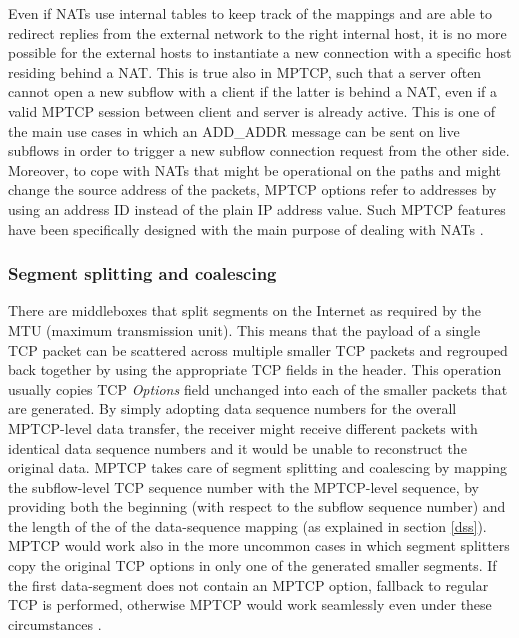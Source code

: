 Even if NATs use internal tables to keep track of the mappings and are able to redirect replies from the external network to the right internal host, it is no more possible for the external hosts to instantiate a new connection with a specific host residing behind a NAT. This is true also in MPTCP, such that a server often cannot open a new subflow with a client if the latter is behind a NAT, even if a valid MPTCP session between client and server is already active. This is one of the main use cases in which an ADD\_ADDR message can be sent on live subflows in order to trigger a new subflow connection request from the other side. Moreover, to cope with NATs that might be operational on the paths and might change the source address of the packets, MPTCP options refer to addresses by using an address ID instead of the plain IP address value. Such MPTCP features have been specifically designed with the main purpose of dealing with NATs \cite{rfc6824}.

\subsubsection{Segment splitting and coalescing}
There are middleboxes that split segments on the Internet as required by the MTU (maximum transmission unit). This means that the payload of a single TCP packet can be scattered across multiple smaller TCP packets and regrouped back together by using the appropriate TCP fields in the header. This operation usually copies TCP \textit{Options} field unchanged into each of the smaller packets that are generated. By simply adopting data sequence numbers for the overall MPTCP-level data transfer, the receiver might receive different packets with identical data sequence numbers and it would be unable to reconstruct the original data. MPTCP takes care of segment splitting and coalescing by mapping the subflow-level TCP sequence number with the MPTCP-level sequence, by providing both the beginning (with respect to the subflow sequence number) and the length of the of the data-sequence mapping (as explained in section \ref{dss}).
MPTCP would work also in the more uncommon cases in which segment splitters copy the original TCP options in only one of the generated smaller segments. If the first data-segment does not contain an MPTCP option, fallback to regular TCP is performed, otherwise MPTCP would work seamlessly even under these circumstances \cite{HDPDB13}.

